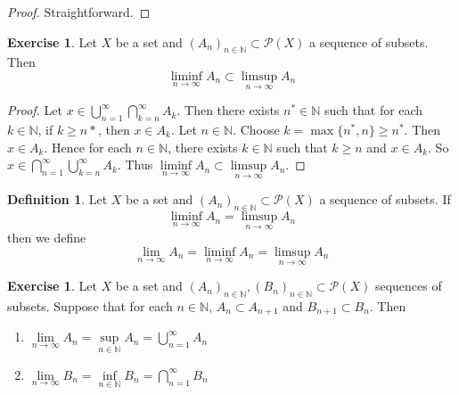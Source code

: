 \documentclass[12pt]{amsart}
\theoremstyle{definition}
\newtheorem{defn}[definition]{Definition}
\newtheorem{ex}[definition]{Exercise}
\newcommand{\N}{\mathbb{N}}
\newcommand{\MP}{\mathcal{P}}
\newcommand{\limn}{\lim \limits_{n \rightarrow \infty}}
\begin{document}
	\begin{proof}
		Straightforward.
	\end{proof}
	
	\begin{ex}
		Let $X$ be a set and $(A_n)_{n \in \N} \subset \MP(X)$ a sequence of subsets. Then $$\liminf_{n \rightarrow \infty} A_n \subset \limsup_{n \rightarrow \infty} A_n$$
	\end{ex}
	
	\begin{proof}
		Let $x \in \bigcup\limits_{n=1}^{\infty} \bigcap\limits_{k =n}^{\infty} A_k$. Then there exists $n^* \in \N$ such that for each $k \in \N$, if $k \geq n*$, then $x \in A_k$. Let $n \in \N$. Choose $k = \max\{n^*,n\} \geq n^*$. Then $x \in A_k$. Hence for each $n \in \N$, there exists $k \in \N$ such that $k \geq n$ and $x \in A_k$. So $x \in \bigcap\limits_{n=1}^{\infty} \bigcup\limits_{k=n}^{\infty} A_k$. Thus $\liminf\limits_{n \rightarrow \infty}A_n \subset \limsup\limits_{n \rightarrow \infty}A_n$.
	\end{proof}
	
	\begin{defn}
		Let $X$ be a set and $(A_n)_{n \in \N} \subset \MP(X)$ a sequence of subsets. If $$\liminf_{n \rightarrow \infty} A_n = \limsup_{n \rightarrow \infty} A_n$$ then we define $$\lim_{n \rightarrow \infty}A_n = \liminf_{n \rightarrow \infty} A_n = \limsup_{n \rightarrow \infty} A_n$$ 
	\end{defn}
	
	\begin{ex}
		Let $X$ be a set and $(A_n)_{n \in \N}, (B_n)_{n \in \N} \subset \MP(X)$ sequences of subsets. Suppose that for each $n \in \N$, $A_n \subset A_{n+1}$ and $B_{n+1} \subset B_n$. Then 
		\begin{enumerate}
			\item $\limn A_n = \sup\limits_{n \in \N}A_n = \bigcup\limits_{n=1}^{\infty}A_n$
			\item $\limn B_n = \inf\limits_{n \in \N}B_n = \bigcap\limits_{n=1}^{\infty}B_n$
		\end{enumerate}
	\end{ex}
	
\end{document}
